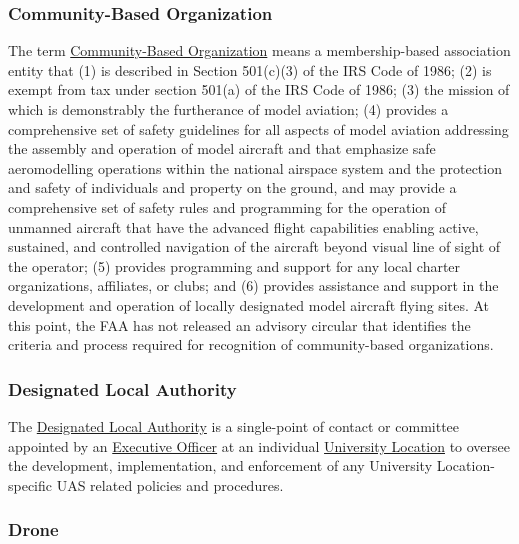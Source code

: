 \documentclass[
]{book}
\begin{document}
\hypertarget{CBO}{%
\subsubsection*{Community-Based Organization}\label{CBO}}

The term \protect\hyperlink{CBO}{Community-Based Organization} means a membership-based association entity that (1) is described in Section 501(c)(3) of the IRS Code of 1986; (2) is exempt from tax under section 501(a) of the IRS Code of 1986; (3) the mission of which is demonstrably the furtherance of model aviation; (4) provides a comprehensive set of safety guidelines for all aspects of model aviation addressing the assembly and operation of model aircraft and that emphasize safe aeromodelling operations within the national airspace system and the protection and safety of individuals and property on the ground, and may provide a comprehensive set of safety rules and programming for the operation of unmanned aircraft that have the advanced flight capabilities enabling active, sustained, and controlled navigation of the aircraft beyond visual line of sight of the operator; (5) provides programming and support for any local charter organizations, affiliates, or clubs; and (6) provides assistance and support in the development and operation of locally designated model aircraft flying sites. At this point, the FAA has not released an advisory circular that identifies the criteria and process required for recognition of community-based organizations.





\hypertarget{DLA}{%
\subsubsection*{Designated Local Authority}\label{DLA}}

The \protect\hyperlink{DLA}{Designated Local Authority} is a single-point of contact or committee appointed by an \protect\hyperlink{EO}{Executive Officer} at an individual \protect\hyperlink{UL}{University Location} to oversee the development, implementation, and enforcement of any University Location-specific UAS related policies and procedures.





\hypertarget{drone}{%
\subsubsection*{Drone}\label{drone}}
\end{document}
